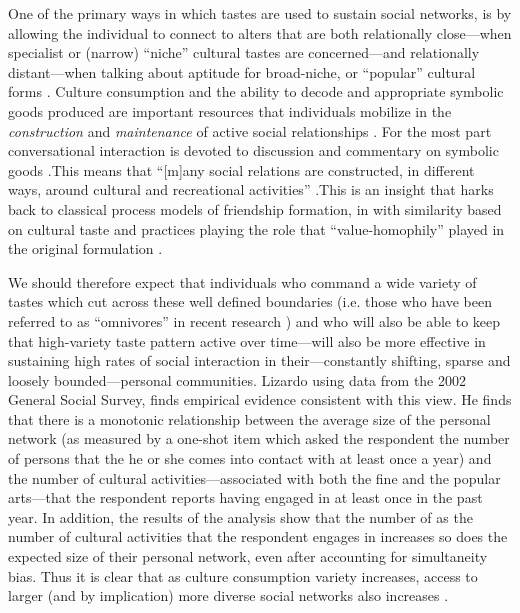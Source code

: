 \documentclass[12pt]{article}
\begin{document}
One of the primary ways in which tastes are used to sustain social networks, is by allowing the individual to connect to alters that are both relationally close---when specialist or (narrow) ``niche'' cultural tastes are concerned---and relationally distant---when talking about aptitude for broad-niche, or ``popular'' cultural forms \citep{lizardo06a}. Culture consumption and the ability to decode and appropriate symbolic goods produced are important resources that individuals mobilize in the \emph{construction} and \emph{maintenance} of active social relationships \citep{cardon_granjon05, dimaggio87, fine77}.  For the most part conversational interaction is devoted to discussion and commentary on symbolic goods \citep{fine77, dimaggio87}.This means that ``[m]any social relations are constructed, in different ways, around cultural and recreational activities'' \citep{cardon_granjon05}.This is an insight that harks back to classical process models of friendship formation, in with similarity based on cultural taste and practices \citep{mark98b}playing the role that ``value-homophily'' played in the original formulation \citep{lazarsfeld_merton54}. 

We should therefore expect that individuals who command a wide variety of tastes which cut across these well defined boundaries (i.e. those who have been referred to as ``omnivores'' in recent research \citep{peterson92, peterson05, peterson_rossman08}) and who will also be able to keep that high-variety taste pattern active over time---will also be more effective in sustaining high rates of social interaction in their---constantly shifting, sparse and loosely bounded---personal communities.  Lizardo \citeyearpar{lizardo06a} using data from the 2002 General Social Survey, finds empirical evidence consistent with this view. He finds that there is a monotonic relationship between the average size of the personal network (as measured by a one-shot item which asked the respondent the number of persons that the he or she comes into contact with at least once a year) and the number of cultural activities---associated with both the fine and the popular arts---that the respondent reports having engaged in at least once in the past year. In addition, the results of the analysis show that the number of as the number of cultural activities that the respondent engages in increases so does the expected size of their personal network, even after accounting for simultaneity bias. Thus it is clear that as culture consumption variety increases, access to larger (and by implication) more diverse social networks also increases \citep{dimaggio87, erickson96, lizardo06a}. 
\end{document}
